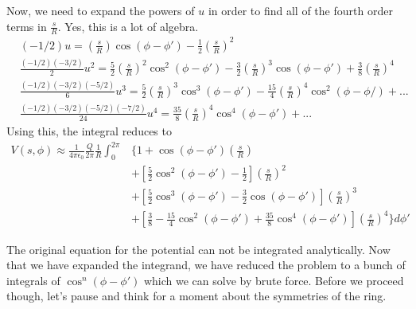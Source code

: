 \documentclass[a4paper, 11pt]{article}
\newenvironment{solution}{%
	\begin{list}{}{%
			\setlength{\topsep}{0pt}%
			\setlength{\leftmargin}{0.5cm}%
			\setlength{\rightmargin}{0.5cm}%
			\setlength{\listparindent}{\parindent}%
			\setlength{\itemindent}{\parindent}%
			\setlength{\parsep}{\parskip}%
		}%
		\item[]}{\end{list}}
\begin{document}
\begin{solution}
  \noindent Now, we need to expand the powers of $u$ in order to find all of the fourth
  order terms in $\frac{s}{R}$. Yes, this is a lot of algebra. 
  \begin{align}
    &(-1/2)u = \left( \frac{s}{R} \right)\cos(\phi-\phi')-\frac{1}{2}\left( \frac{s}{R} \right)^2\\
    &\frac{(-1/2)(-3/2)}{2}u^2 = \frac{5}{2}\left( \frac{s}{R} \right)^2\cos^2(\phi-\phi')-\frac{3}{2}\left( \frac{s}{R} \right)^3\cos(\phi-\phi')+\frac{3}{8}\left( \frac{s}{R} \right)^4 \\
    &\frac{(-1/2)(-3/2)(-5/2)}{6}u^3 = \frac{5}{2}\left( \frac{s}{R} \right)^3\cos^3(\phi-\phi')-\frac{15}{4}\left( \frac{s}{R} \right)^4\cos^2(\phi-\phi/) +...\\
    &\frac{(-1/2)(-3/2)(-5/2)(-7/2)}{24}u^4 = \frac{35}{8}\left( \frac{s}{R} \right)^4\cos^4(\phi-\phi')+...
  \end{align}
  Using this, the integral reduces to
  \begin{equation}
    \begin{split}
      V(s,\phi)\approx\frac{1}{4\pi\epsilon_0}\frac{Q}{2\pi}\frac{1}{R}\int_0^{2\pi}&\Bigg\{ 1+\cos(\phi-\phi')\left( \frac{s}{R} \right)\\
      &+ \left[ \frac{5}{2}\cos^2(\phi-\phi')-\frac{1}{2}  \right]\left( \frac{s}{R} \right)^2\\
      &+ \left[ \frac{5}{2}\cos^3(\phi-\phi')-\frac{3}{2}\cos(\phi-\phi')    \right]\left( \frac{s}{R} \right)^3\\
      &+ \left[ \frac{3}{8}-\frac{15}{4}\cos^2(\phi-\phi')+\frac{35}{8}\cos^4(\phi-\phi') \right]\left( \frac{s}{R} \right)^4  \Bigg\}d\phi'
    \end{split}
  \end{equation}

  \noindent The original equation for the potential can not be integrated analytically.
  Now that we have expanded the integrand, we have reduced the problem to a
  bunch of integrals of $\cos^n(\phi-\phi')$ which we can solve by 
  brute force. Before we proceed though, let's pause and think for a
  moment about the symmetries of the ring.\\
  


\end{solution}
\end{document}
